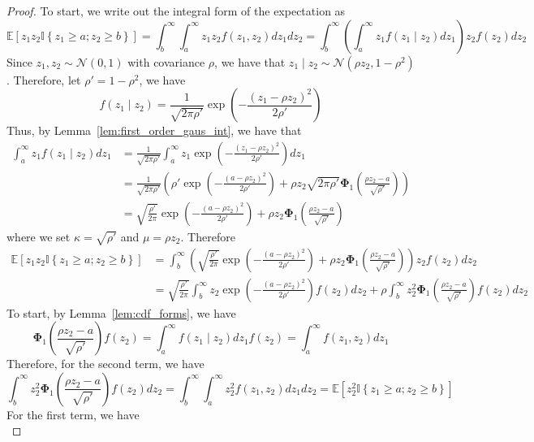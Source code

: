 \documentclass[10pt]{article} %
\theoremstyle{definition}
\theoremstyle{plain}
\newcommand{\paren}[1]{\left(#1\right)}
\newcommand{\indy}[1]{\mathbb{I}\left\{#1\right\}}
\providecommand{\E}{\mathbb{E}}
\begin{document}
\begin{proof}
    To start, we write out the integral form of the expectation as
    \[
        \E\left[z_1z_2\indy{z_1\geq a;z_2\geq b}\right] = \int_b^\infty\int_a^\infty z_1z_2f\paren{z_1,z_2}dz_1dz_2 = \int_b^\infty\paren{\int_a^\infty z_1f\paren{z_1\mid z_2}dz_1}z_2f\paren{z_2}dz_2
    \]
    Since $z_1,z_2\sim\mathcal{N}\paren{0, 1}$ with covariance $\rho$, we have that $z_1\mid z_2\sim\mathcal{N}\paren{\rho z_2,1-\rho^2}$. Therefore, let $\rho' = 1-\rho^2$, we have
    \[
        f\paren{z_1\mid z_2} = \frac{1}{\sqrt{2\pi\rho'}}\exp\paren{-\frac{\paren{z_1-\rho z_2}^2}{2\rho'}}
    \]
    Thus, by Lemma~\ref{lem:first_order_gaus_int}, we have that
    \begin{align*}
        \int_a^\infty z_1f\paren{z_1\mid z_2}dz_1 & = \frac{1}{\sqrt{2\pi\rho'}}\int_a^\infty z_1\exp\paren{-\frac{\paren{z_1-\rho z_2}^2}{2\rho'}}dz_1\\
        & = \frac{1}{\sqrt{2\pi\rho'}}\paren{\rho'\exp\paren{-\frac{\paren{a - \rho z_2}^2}{2\rho'}}+\rho z_2\sqrt{2\pi \rho'}\bm{\Phi}_1\paren{\frac{\rho z_2-a}{\sqrt{\rho'}}}}\\
        & = \sqrt{\frac{\rho'}{2\pi}}\exp\paren{-\frac{\paren{a - \rho z_2}^2}{2\rho'}} + \rho z_2\bm{\Phi}_1\paren{\frac{\rho z_2 - a}{\sqrt{\rho'}}}
    \end{align*}
    where we set $\kappa = \sqrt{\rho'}$ and $\mu = \rho z_2$. Therefore
    \begin{align*}
        \E\left[z_1z_2\indy{z_1\geq a;z_2\geq b}\right] & = \int_b^\infty\paren{\sqrt{\frac{\rho'}{2\pi}}\exp\paren{-\frac{\paren{a - \rho z_2}^2}{2\rho'}} + \rho z_2\bm{\Phi}_1\paren{\frac{\rho z_2 - a}{\sqrt{\rho'}}}}z_2f\paren{z_2}dz_2\\
        & = \sqrt{\frac{\rho'}{2\pi}}\int_b^\infty z_2\exp\paren{-\frac{\paren{a - \rho z_2}^2}{2\rho'}}f\paren{z_2}dz_2 + \rho\int_b^\infty z_2^2\bm{\Phi}_1\paren{\frac{\rho z_2 - a}{\sqrt{\rho'}}}f\paren{z_2}dz_2
    \end{align*}
    To start, by Lemma~\ref{lem:cdf_forms}, we have
    \[
        \bm{\Phi}_1\paren{\frac{\rho z_2 - a}{\sqrt{\rho'}}}f\paren{z_2} = \int_a^\infty f\paren{z_1\mid z_2}dz_1f\paren{z_2} = \int_a^\infty f\paren{z_1, z_2}dz_1
    \]
    Therefore, for the second term, we have
    \[
        \int_b^\infty z_2^2\bm{\Phi}_1\paren{\frac{\rho z_2 - a}{\sqrt{\rho'}}}f\paren{z_2}dz_2 = \int_b^\infty \int_a^\infty z_2^2f\paren{z_1,z_2}dz_1dz_2 = \E\left[z_2^2\indy{z_1\geq a;z_2\geq b}\right]
    \]
    For the first term, we have
    \[
\]
\end{proof}
\end{document}
